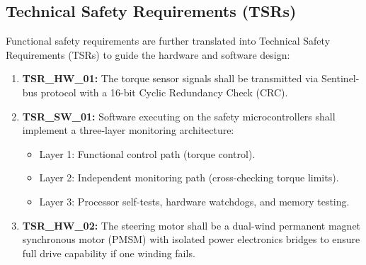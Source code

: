 \subsection{Technical Safety Requirements (TSRs)}
Functional safety requirements are further translated into Technical Safety Requirements (TSRs) to guide the hardware and software design:
\begin{enumerate}
    \item \textbf{TSR\_HW\_01:} The torque sensor signals shall be transmitted via Sentinel-bus protocol with a 16-bit Cyclic Redundancy Check (CRC).
    \item \textbf{TSR\_SW\_01:} Software executing on the safety microcontrollers shall implement a three-layer monitoring architecture:
    \begin{itemize}
        \item Layer 1: Functional control path (torque control).
        \item Layer 2: Independent monitoring path (cross-checking torque limits).
        \item Layer 3: Processor self-tests, hardware watchdogs, and memory testing.
    \end{itemize}
    \item \textbf{TSR\_HW\_02:} The steering motor shall be a dual-wind permanent magnet synchronous motor (PMSM) with isolated power electronics bridges to ensure full drive capability if one winding fails.
\end{enumerate}
